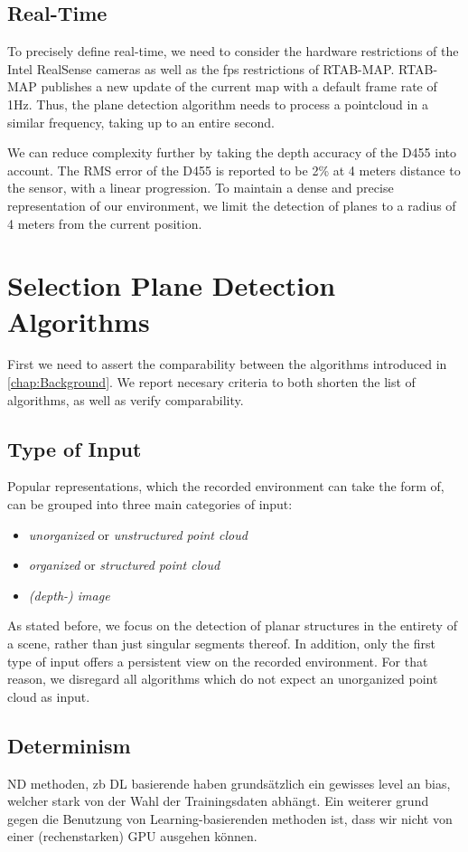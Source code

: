 \documentclass[main.tex]{subfiles}
\begin{document}
\subsection{Real-Time}
To precisely define real-time, we need to consider the hardware restrictions of the Intel RealSense cameras
as well as the fps restrictions of RTAB-MAP.
RTAB-MAP publishes a new update of the current map with a default frame rate of 1Hz.
Thus, the plane detection algorithm needs to process a pointcloud in a similar frequency, taking up to an entire second.

We can reduce complexity further by taking the depth accuracy of the D455 into account. The RMS error of the
D455 is reported to be 2\% at 4 meters distance to the sensor, with a linear progression.
To maintain a dense and precise representation of our environment, we limit the detection of planes to a
radius of 4 meters from the current position.

\section{Selection Plane Detection Algorithms}
First we need to assert the comparability between the algorithms introduced in \ref{chap:Background}.
We report necesary criteria to both shorten the list of algorithms, as well as verify comparability.

\subsection*{Type of Input}
Popular representations, which the recorded environment can take the form of, can be grouped into three main categories of input:
\begin{itemize}
    \item \textit{unorganized} or \textit{unstructured point cloud}
    \item \textit{organized} or \textit{structured point cloud}
    \item \textit{(depth-) image}
\end{itemize}
As stated before, we focus on the detection of planar structures in the entirety of a scene, rather than just singular segments thereof.
In addition, only the first type of input offers a persistent view on the recorded environment.
For that reason, we disregard all algorithms which do not expect an unorganized point cloud as input.




\subsection*{Determinism}
ND methoden, zb DL basierende haben grundsätzlich ein gewisses level an bias, welcher stark von der Wahl der Trainingsdaten abhängt.
Ein weiterer grund gegen die Benutzung von Learning-basierenden methoden ist, dass wir nicht von einer (rechenstarken) GPU ausgehen können.
\end{document}
